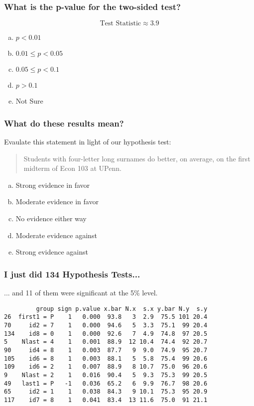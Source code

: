 \documentclass{beamer}
\begin{document}
\begin{frame}[c]\frametitle{What is the p-value for the two-sided test? }
    
$$\boxed{\mbox{Test Statistic} \approx 3.9}$$

\begin{enumerate}[(a)]
	\item $p < 0.01$
	\item $0.01 \leq p < 0.05$
	\item $0.05 \leq p < 0.1$
	\item $p > 0.1$
	\item Not Sure
\end{enumerate}
\end{frame}
\begin{frame}[c]\frametitle{What do these results mean? }

Evaulate this statement in light of our hypothesis test:
\vspace{1em}

\begin{quote}
	Students with four-letter long surnames do better, on average, on the first midterm of Econ 103 at UPenn.
\end{quote}

\begin{enumerate}[(a)]
	\item Strong evidence in favor
	\item Moderate evidence in favor
	\item No evidence either way
	\item Moderate evidence against
	\item Strong evidence against
\end{enumerate}
\end{frame}
\begin{frame}[c,fragile]\frametitle{I just did 134 Hypothesis Tests...}
   
 \begin{block}
 	{... and 11 of them were significant at the 5\% level.}
 \end{block}

\footnotesize

\begin{verbatim}
         group sign p.value x.bar N.x  s.x y.bar N.y  s.y
26  first1 = P    1   0.000  93.8   3  2.9  75.5 101 20.4
70     id2 = 7    1   0.000  94.6   5  3.3  75.1  99 20.4
134    id8 = 0    1   0.000  92.6   7  4.9  74.8  97 20.5
5    Nlast = 4    1   0.001  88.9  12 10.4  74.4  92 20.7
90     id4 = 8    1   0.003  87.7   9  9.0  74.9  95 20.7
105    id6 = 8    1   0.003  88.1   5  5.8  75.4  99 20.6
109    id6 = 2    1   0.007  88.9   8 10.7  75.0  96 20.6
9    Nlast = 2    1   0.016  90.4   5  9.3  75.3  99 20.5
49   last1 = P   -1   0.036  65.2   6  9.9  76.7  98 20.6
65     id2 = 1    1   0.038  84.3   9 10.1  75.3  95 20.9
117    id7 = 8    1   0.041  83.4  13 11.6  75.0  91 21.1
\end{verbatim}
\end{frame}
\end{document}
